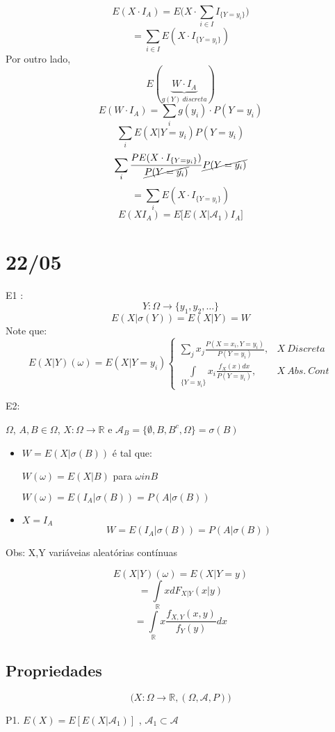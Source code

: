 \documentclass[a4paper,12pt]{article}
\begin{document}
\begin{enumerate}[label=\roman*)]
\begin{enumerate}[label = \arabic*)]
\begin{enumerate}[label=\roman*)]
		$$E(X\cdot I_A) = E\bigg(X\cdot \sum\limits_{i \in I}I_{\{Y=y_i\}}\bigg) $$
		$$=\sum\limits_{i \in I} E(X\cdot I_{\{Y=y_i\}}) $$
		Por outro lado, 
		$$E(\underbrace{W\cdot I_A}_{g(Y) \ discreta}) $$
		$$E(W\cdot I_A)=\sum\limits_i g(y_i)\cdot P(Y=y_i)  $$
		$$\sum\limits_i E(X|Y=y_i) P(Y=y_i) $$
		$$\sum\limits_i \frac{PE(X\cdot I_{\{Y=y_i\}})}{\cancel{P(Y=y_i)}}\cancel{P(Y=y_i)} $$
		$$=\sum\limits_i E(X\cdot I_{\{Y=y_i\}}) $$
		$$E(XI_A)=E\bigg[E(X|\mathscr A_1)I_A\bigg] $$
	\end{enumerate}
\end{enumerate}
\end{enumerate}

\newpage 

\section*{22/05}
E1 : $$Y:\Omega \longrightarrow\{y_1,y_2,\ldots\} $$
$$E(X|\sigma(Y)) = E(X|Y) = W $$
Note que:
$$E(X|Y)(\omega) = E(X|Y=y_i)\begin{cases}
\sum\limits_j x_j \frac{P(X=x_i,Y=y_i)}{P(Y=y_i)}, & X \ Discreta\\
\int\limits_{\{Y=y_i\}} x_i \frac{f_X(x)dx}{P(Y=y_i)}, & X \ Abs. \ Cont
\end{cases}
 $$
 
 E2:
 
 $\Omega$, $A,B\in \Omega $, $X:\Omega \longrightarrow \mathbb R$ e $\mathscr A_B=\{ \emptyset,B,B^c,\Omega \}=\sigma(B)$
\begin{itemize}
	\item  $W = E(X|\sigma(B))$ é tal que:
	
	$W(\omega) = E(X|B)  $ para $\omega in B$
	
	$W(\omega) = E(I_A|\sigma(B))=P(A|\sigma(B))$
	\item $X=I_A$
	$$W=E(I_A|\sigma(B)) = P(A|\sigma(B)) $$
\end{itemize}
Obs: X,Y variáveias aleatórias contínuas

$$E(X|Y)(\omega) = E(X|Y=y) $$
$$=\int\limits_\mathbb R x dF_{X|Y}(x|y) $$
$$=\int\limits_{\mathbb R} x \frac{f_{X,Y}(x,y)}{f_Y(y)}dx $$

\subsection{Propriedades}
$$\bigg(
X:\Omega \longrightarrow \mathbb R, (\Omega,\mathscr{A},P)
\bigg) $$

P1. $E(X) = E[E(X|\mathscr A_1)] $ , $\mathscr A_1 \subset \mathscr A$
\end{document}
